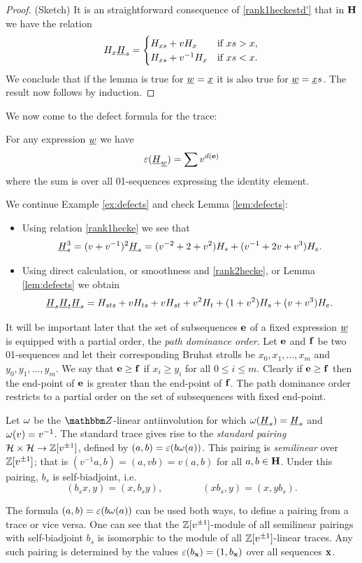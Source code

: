 \begin{proof}(Sketch) It is an straightforward consequence of \eqref{rank1heckestd'} that in ${\mathbf H}$ we have the relation
\[
H_x\underline{H}_s = \begin{cases} H_{xs} + vH_{x} & \text{if $xs > x$,} \\
H_{xs} + v^{-1}H_x & \text{if $xs < x$.} \end{cases}
\]
We conclude that if the lemma is true for $\underline{w} = \underline{x}$ it is also true for $\underline{w} = \underline{x}s$. The result now follows by induction.
\end{proof}

We now come to the defect formula for the trace:

\begin{cor}\label{cor:defects}
For any expression $\underline{w}$ we have
\[ \varepsilon(\underline{H}_{\underline{w}}) = \sum v^{d({\mathbf e})} \]
where the sum is over all 01-sequences expressing the identity element.\end{cor}

\begin{ex} We continue Example \ref{ex:defects} and check Lemma \ref{lem:defects}:
  \begin{itemize}
  \item Using relation \eqref{rank1hecke} we see that
\[
\underline{H}_s^3=(v+v^{-1})^2\underline{H}_s = (v^{-2} + 2 + v^2)H_s + (v^{-1}+2v+v^3)H_e.
\]
  \item Using direct calculation, or smoothness and \eqref{rank2hecke}, or Lemma \ref{lem:defects} we obtain
\[
\underline{H}_s\underline{H}_t\underline{H}_s = H_{sts} + vH_{ts} + vH_{st} + v^2H_t + (1+v^2)H_s + (v+v^3)H_e.
\]
  \end{itemize}
\end{ex}

It will be important later that the set of subsequences ${\mathbf e}$ of a fixed expression $\underline{w}$ is equipped with a partial order, the \emph{path dominance order}. Let ${\mathbf e}$ and ${\mathbf f}$ be two 01-sequences and let their corresponding Bruhat strolls be $x_0, x_1, \dots, x_m$ and $y_0, y_1, \dots, y_m$. We say that ${\mathbf e} \ge {\mathbf f}$ if $x_i \ge y_i$ for all $0 \le i \le m$. Clearly if ${\mathbf e} \ge {\mathbf f}$ then the end-point of ${\mathbf e}$ is greater than the end-point of ${\mathbf f}$. The path dominance order restricts to a partial order on the set of subsequences with fixed end-point.

Let $\omega$ be the $\Z$-linear antiinvolution for which $\omega(\underline{H}_s)=\underline{H}_s$ and $\omega(v)=v^{-1}$. The standard trace gives rise to the \emph{standard pairing} ${\mathcal{H}} \times {\mathcal{H}} \rightarrow {\mathbb{Z}}[v^{\pm 1}]$,
defined by $(a,b) = \varepsilon(b\omega(a))$. This pairing is \emph{semilinear} over ${\mathbb{Z}}[v^{\pm 1}]$; that is $(v^{-1}a,b)=(a,vb)=v(a,b)$ for all $a, b \in {\mathbf H}$. Under this pairing, $b_s$ is self-biadjoint, i.e. \[(b_s x,y) = (x,b_s y),\qquad \qquad (x b_s,y) = (x,y b_s). \]

\begin{remark} \label{rmk:traces pairings} The formula $(a,b) = \varepsilon(b\omega(a))$ can be used both ways, to define a pairing from a trace or vice versa. One can see that the ${\mathbb{Z}}[v^{\pm 1}]$-module of all
semilinear pairings with self-biadjoint $b_s$ is isomorphic to the module of all ${\mathbb{Z}}[v^{\pm 1}]$-linear traces. Any such pairing is determined by the values $\varepsilon(b_{\mathbf x})=(1,b_{\mathbf x})$ over all sequences
${\mathbf x}$. \end{remark}
